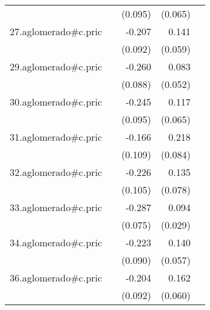 {\begin{longtable}{l*{4}{D{.}{.}{-1}}}
            &                     &     (0.095)         &     (0.065)         &                     \\
\addlinespace
27.aglomerado#c.pric&                     &      -0.207\sym{*}  &       0.141\sym{*}  &                     \\
            &                     &     (0.092)         &     (0.059)         &                     \\
\addlinespace
29.aglomerado#c.pric&                     &      -0.260\sym{**} &       0.083         &                     \\
            &                     &     (0.088)         &     (0.052)         &                     \\
\addlinespace
30.aglomerado#c.pric&                     &      -0.245\sym{*}  &       0.117         &                     \\
            &                     &     (0.095)         &     (0.065)         &                     \\
\addlinespace
31.aglomerado#c.pric&                     &      -0.166         &       0.218\sym{**} &                     \\
            &                     &     (0.109)         &     (0.084)         &                     \\
\addlinespace
32.aglomerado#c.pric&                     &      -0.226\sym{*}  &       0.135         &                     \\
            &                     &     (0.105)         &     (0.078)         &                     \\
\addlinespace
33.aglomerado#c.pric&                     &      -0.287\sym{***}&       0.094\sym{**} &                     \\
            &                     &     (0.075)         &     (0.029)         &                     \\
\addlinespace
34.aglomerado#c.pric&                     &      -0.223\sym{*}  &       0.140\sym{*}  &                     \\
            &                     &     (0.090)         &     (0.057)         &                     \\
\addlinespace
36.aglomerado#c.pric&                     &      -0.204\sym{*}  &       0.162\sym{**} &                     \\
            &                     &     (0.092)         &     (0.060)         &                     \\

\end{longtable}}
